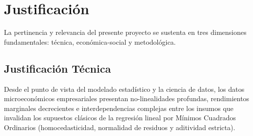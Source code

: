 \section{Justificación}
\label{sec:justificacion}

La pertinencia y relevancia del presente proyecto se sustenta en tres dimensiones fundamentales: técnica, económica-social y metodológica.

\subsection{Justificación Técnica}
Desde el punto de vista del modelado estadístico y la ciencia de datos, los datos microeconómicos empresariales presentan no-linealidades profundas, rendimientos marginales decrecientes e interdependencias complejas entre los insumos que invalidan los supuestos clásicos de la regresión lineal por Mínimos Cuadrados Ordinarios (homocedasticidad, normalidad de residuos y aditividad estricta). 

